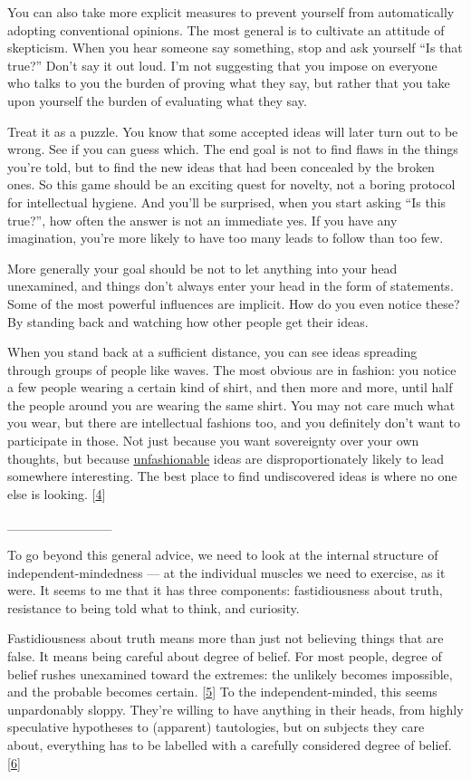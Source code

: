 You can also take more explicit measures to prevent yourself from
automatically adopting conventional opinions. The most general is to
cultivate an attitude of skepticism. When you hear someone say
something, stop and ask yourself ``Is that true?'' Don't say it out
loud. I'm not suggesting that you impose on everyone who talks to you
the burden of proving what they say, but rather that you take upon
yourself the burden of evaluating what they say.

Treat it as a puzzle. You know that some accepted ideas will later turn
out to be wrong. See if you can guess which. The end goal is not to find
flaws in the things you're told, but to find the new ideas that had been
concealed by the broken ones. So this game should be an exciting quest
for novelty, not a boring protocol for intellectual hygiene. And you'll
be surprised, when you start asking ``Is this true?'', how often the
answer is not an immediate yes. If you have any imagination, you're more
likely to have too many leads to follow than too few.

More generally your goal should be not to let anything into your head
unexamined, and things don't always enter your head in the form of
statements. Some of the most powerful influences are implicit. How do
you even notice these? By standing back and watching how other people
get their ideas.

When you stand back at a sufficient distance, you can see ideas
spreading through groups of people like waves. The most obvious are in
fashion: you notice a few people wearing a certain kind of shirt, and
then more and more, until half the people around you are wearing the
same shirt. You may not care much what you wear, but there are
intellectual fashions too, and you definitely don't want to participate
in those. Not just because you want sovereignty over your own thoughts,
but because \href{nov.html}{unfashionable} ideas are disproportionately
likely to lead somewhere interesting. The best place to find
undiscovered ideas is where no one else is looking.
{[}\hyperref[f4n]{4}{]}

\_\_\_\_\_\_\_\_\_\_\_

To go beyond this general advice, we need to look at the internal
structure of independent-mindedness --- at the individual muscles we
need to exercise, as it were. It seems to me that it has three
components: fastidiousness about truth, resistance to being told what to
think, and curiosity.

Fastidiousness about truth means more than just not believing things
that are false. It means being careful about degree of belief. For most
people, degree of belief rushes unexamined toward the extremes: the
unlikely becomes impossible, and the probable becomes certain.
{[}\hyperref[f5n]{5}{]} To the independent-minded, this seems
unpardonably sloppy. They're willing to have anything in their heads,
from highly speculative hypotheses to (apparent) tautologies, but on
subjects they care about, everything has to be labelled with a carefully
considered degree of belief. {[}\hyperref[f6n]{6}{]}

